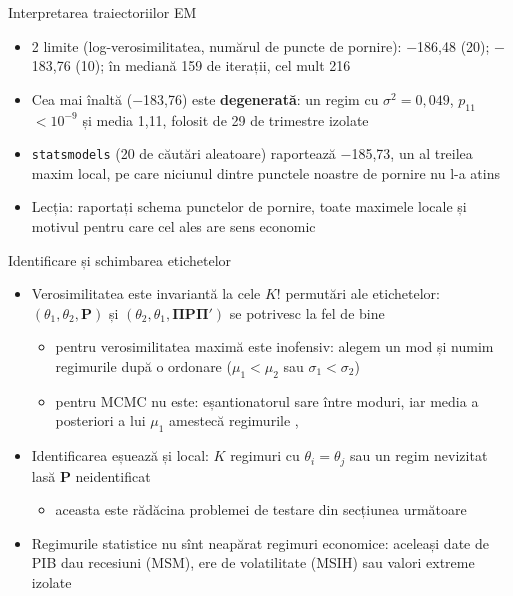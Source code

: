 \begin{frame}{Interpretarea traiectoriilor EM}
\itemsize{\small}
\begin{itemize}
    \item 2 limite (log-verosimilitatea, numărul de puncte de pornire): \ensuremath{-}186{,}48 (20); \ensuremath{-}183{,}76 (10); în mediană 159 de iterații, cel mult 216
    \item Cea mai înaltă (\ensuremath{-}183{,}76) este \textbf{degenerată}: un regim cu $\sigma^2 = 0{,}049$, $p_{11}$ $<10^{-9}$ și media 1{,}11, folosit de 29 de trimestre izolate
    \item \texttt{statsmodels} (20 de căutări aleatoare) raportează \ensuremath{-}185{,}73, un al treilea maxim local, pe care niciunul dintre punctele noastre de pornire nu l-a atins
    \item Lecția: raportați schema punctelor de pornire, toate maximele locale și motivul pentru care cel ales are sens economic
\end{itemize}
\end{frame}

\begin{frame}{Identificare și schimbarea etichetelor}
\itemsize{\small}
\begin{itemize}
    \item Verosimilitatea este invariantă la cele $K!$ permutări ale etichetelor: $(\theta_1, \theta_2, \mathbf{P})$ și $(\theta_2, \theta_1, \mathbf{\Pi P\Pi}')$ se potrivesc la fel de bine
    \begin{itemize}
        \item pentru verosimilitatea maximă este inofensiv: alegem un mod și numim regimurile după o ordonare ($\mu_1 < \mu_2$ sau $\sigma_1 < \sigma_2$)
        \item pentru MCMC nu este: eșantionatorul sare între moduri, iar media a posteriori a lui $\mu_1$ amestecă regimurile , 
    \end{itemize}
    \item Identificarea eșuează și local: $K$ regimuri cu $\theta_i = \theta_j$ sau un regim nevizitat lasă $\mathbf{P}$ neidentificat
    \begin{itemize}
        \item aceasta este rădăcina problemei de testare din secțiunea următoare
    \end{itemize}
    \item Regimurile statistice nu sînt neapărat regimuri economice: aceleași date de PIB dau recesiuni (MSM), ere de volatilitate (MSIH) sau valori extreme izolate
\end{itemize}
\end{frame}


